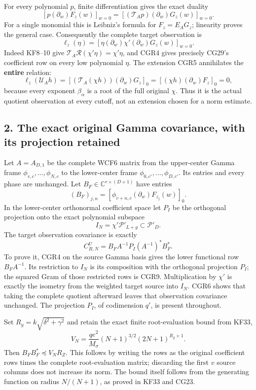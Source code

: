 For every polynomial \(p\), finite differentiation gives the exact duality \[
[p(\partial_w)F_z(w)]_{w=0}
=[(\mathcal T_Ap)(\partial_w)G_z(w)]_{w=0}.
\tag{CGR4}
\] For a single monomial this is Leibniz's formula for \(F_z=E_AG_z\); linearity proves the general case. Consequently the complete target observation is \[
\ell_z(\eta)=
[\eta(\partial_w)\chi'(\partial_w)G_z(w)]_{w=0}.
\tag{CGR5}
\] Indeed KF8--10 give \(\mathcal T_A\mathcal R(\chi'\eta)=\chi'\eta\), and CGR4 gives precisely CG29's coefficient row on every low polynomial \(\eta\). The extension CGR5 annihilates the \textbf{entire} relation: \[
\ell_z(\mathcal U_Ah)
=[(\mathcal T_A(\chi h))(\partial_w)G_z]_{0}
=[(\chi h)(\partial_w)F_z]_{0}=0,
\tag{CGR6}
\] because every exponent \(\beta_\alpha\) is a root of the full original \(\chi\). Thus it is the actual quotient observation at every cutoff, not an extension chosen for a norm estimate.

\subsection{2. The exact original Gamma covariance, with its projection retained}\label{the-exact-original-gamma-covariance-with-its-projection-retained}

Let \(A=A_{D,1}\) be the complete WCF6 matrix from the upper-center Gamma frame \(\phi_{v,c},\ldots,\phi_{N,c}\) to the lower-center frame \(\phi_{0,c'},\ldots,\phi_{D,c'}\). Its entries and every phase are unchanged. Let \(B_F\in\mathbb C^{r\times(D+1)}\) have entries \[
(B_F)_{j,n}=[\phi_{v+n,c}(\partial_w)F_{z_j}(w)]_{0}.
\tag{CGR7}
\] In the lower-center orthonormal coefficient space let \(P_I\) be the orthogonal projection onto the exact polynomial subspace \[
I_N=\chi'\mathcal P'_{L+g}\subset\mathcal P'_D.
\tag{CGR8}
\] The target observation covariance is exactly \[
\boxed{C_{R,N}^U=B_FA^{-1}P_I(A^{-1})^*B_F^*.}
\tag{CGR9}
\] To prove it, CGR4 on the source Gamma basis gives the lower functional row \(B_FA^{-1}\). Its restriction to \(I_N\) is its composition with the orthogonal projection \(P_I\); the squared Gram of those restricted rows is CGR9. Multiplication by \(\chi'\) is exactly the isometry from the weighted target source into \(I_N\). CGR6 shows that taking the complete quotient afterward leaves that observation covariance unchanged. The projection \(P_I\), of codimension \(q'\), is present throughout.

Set \(R_y=k\sqrt{\delta^2+\gamma^2}\) and retain the exact finite root-evaluation bound from KF33, \[
V_N=\frac{qe^2}{M_\sigma}(N+1)^{3/2}(2N+1)^{R_y+1}.
\tag{CGR10}
\] Then \(B_FB_F^*\preceq V_NR_Z\). This follows by writing the rows as the original coefficient rows times the complete root-evaluation matrix; discarding the first \(v\) source columns does not increase its norm. The bound itself follows from the generating function on radius \(N/(N+1)\), as proved in KF33 and CG23.


